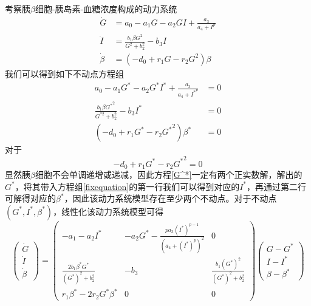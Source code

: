 考察胰$\beta$细胞-胰岛素-血糖浓度构成的动力系统
\begin{equation}
    \begin{aligned}
        \dot{G}     & = a_0-a_1G-a_2GI+\frac{a_3}{a_4+I^p}       \\
        \dot{I}     & = \frac{b_1\beta G^2}{G^2 + b_2^2} - b_3 I \\
        \dot{\beta} & = (-d_0+r_1G-r_2G^2)\beta
    \end{aligned}
\end{equation}
我们可以得到如下不动点方程组
\begin{equation}\label{fixequation}
    \begin{aligned}
        a_0-a_1G^*-a_2G^*I^*+\frac{a_3}{a_4+{I^*}^p}     & =0 \\
        \frac{b_1\beta {G^*}^2}{G^{*2} + b_2^2} - b_3I^* & =0 \\
        (-d_0+r_1G^*-r_2{G^*}^2)\beta^*                  & =0
    \end{aligned}
\end{equation}
对于
\begin{equation}\label{G^*}
    -d_0+r_1G^*-r_2{G^*}^2=0
\end{equation}
显然胰$\beta$细胞不会单调递增或递减，因此方程\ref{G^*}一定有两个正实数解，解出的$G^*$，将其带入方程组\ref{fixequation}的第一行我们可以得到对应的$I^*$，再通过第二行可解得对应的$\beta^*$，因此该动力系统模型存在至少两个不动点。对于不动点$(G^*,I^*,\beta^*)$，线性化该动力系统模型可得
\begin{equation}\label{linear}
    \begin{pmatrix}
        \dot{G} \\
        \dot{I} \\
        \dot{\beta}
    \end{pmatrix}=\begin{pmatrix}
        -a_1-a_2I^*                            & -a_2G^*-\frac{pa_3(I^*)^{p-1}}{(a_4+(I^*)^p)^2} & 0                                  \\
        \frac{2b_1\beta^*G^*}{(G^*)^2 + b_2^2} & -b_3                                            & \frac{b_1(G^*)^2}{(G^*)^2 + b_2^2} \\
        r_1\beta^*-2r_2G^*\beta^*              & 0                                               & 0
    \end{pmatrix}\begin{pmatrix}
        G-G^* \\
        I-I^* \\
        \beta-\beta^*
    \end{pmatrix}
\end{equation}


